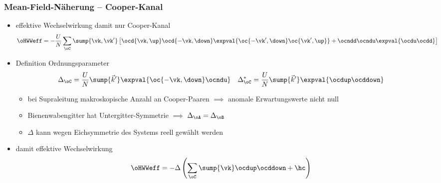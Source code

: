 \begin{frame}
    \frametitle{Mean-Field-Näherung -- Cooper-Kanal}
    \begin{itemize}
        \item effektive Wechselwirkung damit nur Cooper-Kanal
        \begin{align*}
            \oHWWeff &= -\frac{U}{N} \sum_\oC \sump{\vk, \vk'}\left[\ocd{\vk, \up} \ocd{-\vk, \down} \expval{\oc{-\vk', \down} \oc{\vk', \up}} + \ocndd \ocndu \expval{\ocdu \ocdd}\right]
        \end{align*}
        \pause
        \item Definition Ordnungsparameter
        \begin{align*}
            \Delta_\oC &= \frac{U}{N} \sump{\vec{k}'} \expval{\oc{-\vk, \down} \ocndu} &\Delta_{\oC}^{*} &= \frac{U}{N} \sump{\vec{k}'} \expval{\ocdup \ocddown}
        \end{align*}
        \pause
        \begin{itemize}
            \item[$\rightarrow$] bei Supraleitung makroskopische Anzahl an Cooper-Paaren $\implies$ anomale Erwartungswerte nicht null 
            \item[$\rightarrow$] Bienenwabengitter hat Untergitter-Symmetrie $\implies$ $\Delta_\oA = \Delta_\oB$
            \item[$\rightarrow$] $\Delta$ kann wegen Eichsymmetrie des Systems reell gewählt werden
        \end{itemize}
        \pause
        \item damit effektive Wechselwirkung
        \begin{align*}
            \oHWWeff &= - \Delta \left(\sum_\oC \sump{\vk} \ocdup \ocddown + \hc\right)
        \end{align*}
    \end{itemize}
\end{frame}

